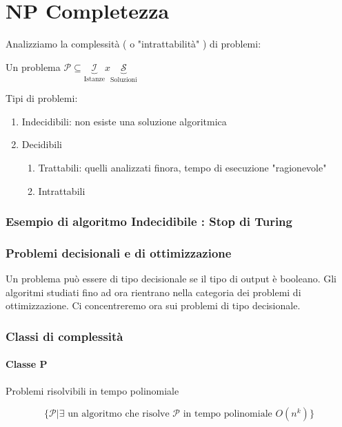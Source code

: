 \chapter{NP Completezza}

Analizziamo la complessità ( o  "intrattabilità" ) di problemi:

Un problema $\mathcal{P} \subseteq \underbrace{\mathcal{I} }_\text{Istanze} x  \underbrace{\mathcal{S} }_\text{Soluzioni}$

Tipi di problemi:

\begin{enumerate}

\item Indecidibili: non esiste una soluzione algoritmica
\item Decidibili
\begin{enumerate}
\item Trattabili: quelli analizzati finora, tempo di esecuzione "ragionevole"
\item Intrattabili
\end{enumerate}

\end{enumerate}

\subsection{Esempio di algoritmo Indecidibile : Stop di Turing}


\subsection{Problemi decisionali e di ottimizzazione}

Un problema può essere di tipo decisionale se il tipo di output è booleano. Gli algoritmi studiati fino ad ora rientrano nella categoria dei problemi di ottimizzazione. Ci concentreremo ora sui problemi di tipo decisionale.

\subsection{Classi di complessità}

\subsubsection{Classe P}
Problemi risolvibili in tempo polinomiale

\begin{equation}
\{\mathcal{P} | \exists \text{ un algoritmo che risolve } \mathcal{P} \text{ in tempo polinomiale } O(n^k)\}
\end{equation}


